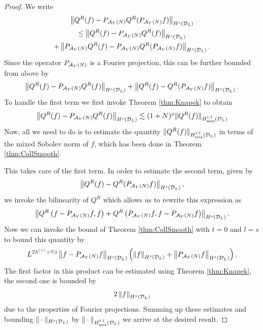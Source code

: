 \begin{proof}
    We write
    \begin{multline*}
        \left\|Q^R(f) - P_{\mathcal{A}_Y(N)} Q^R(P_{\mathcal{A}_Y(N)}f)\right\|_{H^s(\mathcal{D}_L)} \\
        \le \left\|Q^R(f) - P_{\mathcal{A}_Y(N)} Q^R(f)\right\|_{H^s(\mathcal{D}_L)} \\
                + \left\|P_{\mathcal{A}_Y(N)}Q^R(f) - P_{\mathcal{A}_Y(N)}
                Q^R(P_{\mathcal{A}_Y(N)}f)\right\|_{H^s(\mathcal{D}_L)}.
    \end{multline*}
    Since the operator $P_{\mathcal{A}_Y(N)}$ is a Fourier projection, this can be further
    bounded from above by
    \[
        \left\|Q^R(f) - P_{\mathcal{A}_Y(N)} Q^R(f)\right\|_{H^s(\mathcal{D}_L)} + 
        \left\|Q^R(f) - Q^R(P_{\mathcal{A}_Y(N)}f)\right\|_{H^s(\mathcal{D}_L)}.
    \]
    To handle the first term we first invoke Theorem \ref{thm:Knapek}
    to obtain  
    $$
        \left\|Q^R(f) - P_{\mathcal{A}_Y(N)} Q^R(f)\right\|_{H^s(\mathcal{D}_L)} \lesssim 
            (1+N)^\rho \|Q^R(f)\|_{{H}_{\mathrm{mix}}^{t,l}(\mathcal{D}_L)}
    $$
    Now, all we need to do is to estimate the quantity 
    $\|Q^R(f)\|_{{H}_{\mathrm{mix}}^{t,l}(\mathcal{D}_L)}$ in terms of the
    mixed Sobolev norm of $f$, which has been done in Theorem
    \ref{thm:CollSmooth}.

    This takes care of the first term.  In order to estimate the second term,
    given by
    \[
        \left\|Q^R(f) - Q^R(P_{\mathcal{A}_Y(N)}f)\right\|_{H^s(\mathcal{D}_L)},
    \]
    we invoke the bilinearity of $Q^R$ which allows us to rewrite this
    expression as 
    \[
        \left\|Q^R\left(f - P_{\mathcal{A}_Y(N)}f,f\right) + Q^R\left(
                P_{\mathcal{A}_Y(N)}f,f-P_{\mathcal{A}_Y(N)}f\right) \right\|_{H^s(\mathcal{D}_L)}.
    \]
    Now we can invoke the bound of Theorem \ref{thm:CollSmooth} with $t=0$ and
    $l=s$ to bound this quantity by 
    \[
        L^{2\lambda^{(+)}+\nicefrac{d}{2}}
        \left\|f - P_{\mathcal{A}_Y(N)}f\right\|_{H^s(\mathcal{D}_L)} 
                \left(\left\|f\right\|_{H^s(\mathcal{D}_L)}+
                \left\|P_{\mathcal{A}_Y(N)}f\right\|_{H^s(\mathcal{D}_L)} \right).
    \]
    The first factor in this product can be estimated using Theorem
    \ref{thm:Knapek}, the second one is bounded by
    \[
        2\left\|f\right\|_{H^s(\mathcal{D}_L)}
    \]
    due to the properties of Fourier projections. Summing up these estimates and bounding 
    $\|\cdot\|_{H^s(\mathcal{D}_L)}$ by $\|\cdot\|_{{H}_\mathrm{mix}^{t,l}(\mathcal{D}_L)}$
    we arrive at the desired result.
\end{proof}

